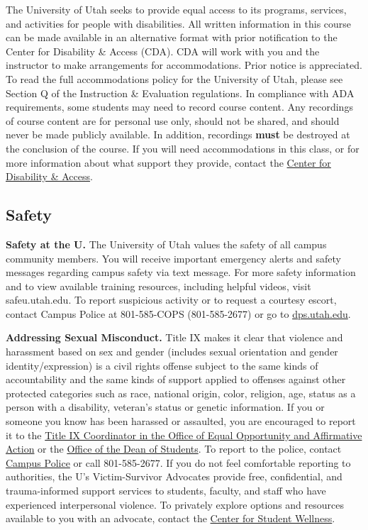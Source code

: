 \documentclass[
  letterpaper,
]{article}
\begin{document}
The University of Utah seeks to provide equal access to its programs,
services, and activities for people with disabilities. All written
information in this course can be made available in an alternative
format with prior notification to the Center for Disability \& Access
(CDA). CDA will work with you and the instructor to make arrangements
for accommodations. Prior notice is appreciated. To read the full
accommodations policy for the University of Utah, please see Section Q
of the Instruction \& Evaluation regulations. In compliance with ADA
requirements, some students may need to record course content. Any
recordings of course content are for personal use only, should not be
shared, and should never be made publicly available. In addition,
recordings \textbf{must} be destroyed at the conclusion of the course.
If you will need accommodations in this class, or for more information
about what support they provide, contact the
\href{https://disability.utah.edu/}{Center for Disability \& Access}.

\subsection{Safety}\label{safety}

\textbf{Safety at the U.} The University of Utah values the safety of
all campus community members. You will receive important emergency
alerts and safety messages regarding campus safety via text message. For
more safety information and to view available training resources,
including helpful videos, visit safeu.utah.edu. To report suspicious
activity or to request a courtesy escort, contact Campus Police at
801-585-COPS (801-585-2677) or go to
\href{https://dps.utah.edu/}{dps.utah.edu}.

\textbf{Addressing Sexual Misconduct.} Title IX makes it clear that
violence and harassment based on sex and gender (includes sexual
orientation and gender identity/expression) is a civil rights offense
subject to the same kinds of accountability and the same kinds of
support applied to offenses against other protected categories such as
race, national origin, color, religion, age, status as a person with a
disability, veteran's status or genetic information. If you or someone
you know has been harassed or assaulted, you are encouraged to report it
to the \href{https://oeo.utah.edu/}{Title IX Coordinator in the Office
of Equal Opportunity and Affirmative Action} or the
\href{https://deanofstudents.utah.edu/}{Office of the Dean of Students}.
To report to the police, contact \href{https://dps.utah.edu/}{Campus
Police} or call 801-585-2677. If you do not feel comfortable reporting
to authorities, the U's Victim-Survivor Advocates provide free,
confidential, and trauma-informed support services to students, faculty,
and staff who have experienced interpersonal violence. To privately
explore options and resources available to you with an advocate, contact
the \href{http://wellness.utah.edu/}{Center for Student Wellness}.
\end{document}
